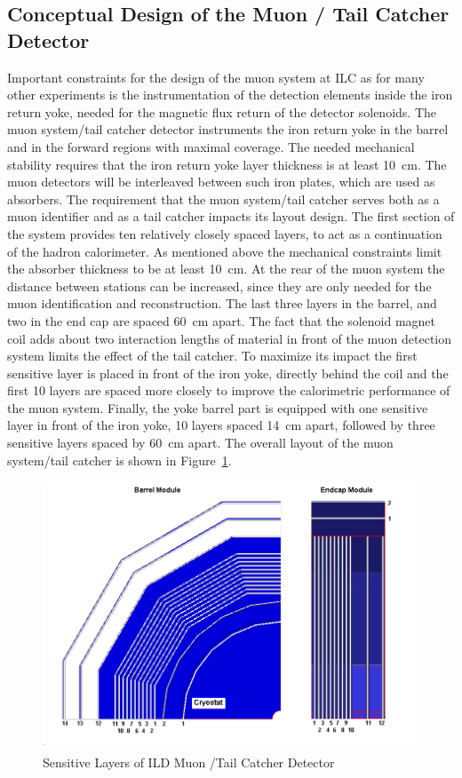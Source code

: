 \subsection{Conceptual Design of the Muon / Tail Catcher Detector}
Important constraints for the design of the muon system at ILC as for many other experiments is the instrumentation of the detection elements inside the iron return yoke, needed for the magnetic flux return of the detector solenoids.
The muon system/tail catcher detector instruments the iron return yoke in the barrel and in the forward regions with maximal coverage.
The needed mechanical stability requires that the iron return yoke layer thickness is at least \SI{10}{cm}. The muon detectors will be interleaved between such iron plates, which are used as absorbers.
The requirement that the muon system/tail catcher serves both as a muon identifier and as a tail catcher impacts its layout design.
The first section of the system provides ten relatively closely spaced layers, to act as a continuation of the hadron calorimeter.
As mentioned above the mechanical constraints limit the absorber thickness to be at least \SI{10}{cm}.
At the rear of the muon system the distance between stations can be increased, since they are only needed for the muon identification and reconstruction.
The last three layers in the barrel, and two in the end cap are spaced \SI{60}{cm} apart.
The fact that the solenoid magnet coil adds about two interaction lengths of material in front of the muon detection system limits the effect of the tail catcher.
To maximize its impact the first sensitive layer is placed in front of the iron yoke, directly behind the coil and the first 10 layers are spaced more closely
to improve the calorimetric performance of the muon system.
Finally, the yoke barrel part is equipped with one sensitive layer in front of the iron yoke, 10 layers spaced \SI{14}{cm} apart, followed by three sensitive layers spaced by \SI{60}{cm} apart. The overall layout of the muon system/tail catcher is shown in Figure~\ref{fig:ild:muon:tailCatcher}.
\begin{figure}
	\centering
	\includegraphics[height=8cm]{MuonDetector/MuonDetectorILD/2D_barel_endcap.png}
	\caption{Sensitive Layers of ILD Muon /Tail Catcher Detector}
	\label{fig:ild:muon:tailCatcher}
\end{figure}

